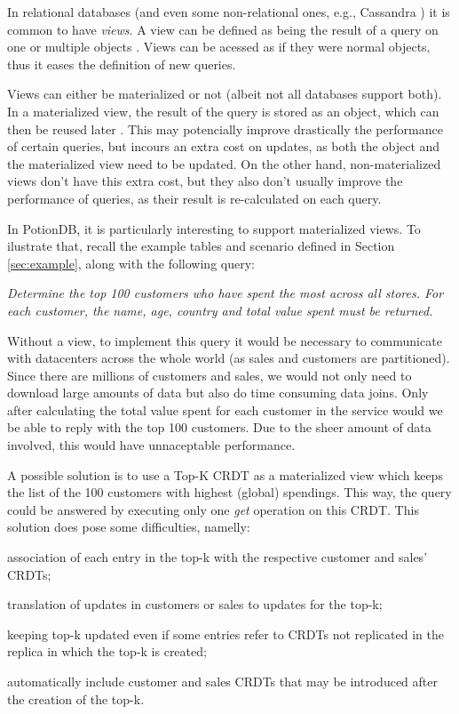 \documentclass{vldb}
\newcommand{\emphvspace}{0.5\baselineskip}
\newcommand{\lineemph}[1]{\vspace{\emphvspace}\hspace{2em}\emph{#1}\vspace{\emphvspace}}
\begin{document}
In relational databases (and even some non-relational ones, e.g., Cassandra \cite{???}) it is common to have \emph{views}. 
A view can be defined as being the result of a query on one or multiple objects \cite{???}.
Views can be acessed as if they were normal objects, thus it eases the definition of new queries.

Views can either be materialized or not (albeit not all databases support both). %
In a materialized view, the result of the query is stored as an object, which can then be reused later \cite{???}.
This may potencially improve drastically the performance of certain queries, but incours an extra cost on updates, as both the object and the materialized view need to be updated.
On the other hand, non-materialized views don't have this extra cost, but they also don't usually improve the performance of queries, as their result is re-calculated on each query.


In PotionDB, it is particularly interesting to support materialized views.
To ilustrate that, recall the example tables and scenario defined in Section \ref{sec:example}, along with the following query: 

\lineemph{Determine the top 100 customers who have spent the most across all stores. For each customer, the name, age, country and total value spent must be returned.}

Without a view, to implement this query it would be necessary to communicate with datacenters across the whole world (as sales and customers are partitioned). 
Since there are millions of customers and sales, we would not only need to download large amounts of data but also do time consuming data joins.
Only after calculating the total value spent for each customer in the service would we be able to reply with the top 100 customers.
Due to the sheer amount of data involved, this would have unnaceptable performance.

A possible solution is to use a Top-K CRDT %
as a materialized view which keeps the list of the 100 customers with highest (global) spendings.
This way, the query could be answered by executing only one \emph{get} operation on this CRDT.
This solution does pose some difficulties, namelly: 
\begin{enumerate*}[label=(\roman*)]
	\item association of each entry in the top-k with the respective customer and sales' CRDTs;
	\item translation of updates in customers or sales to updates for the top-k;
	\item keeping top-k updated even if some entries refer to CRDTs not replicated in the replica in which the top-k is created;
	\item automatically include customer and sales CRDTs that may be introduced after the creation of the top-k.
\end{enumerate*}
\end{document}
